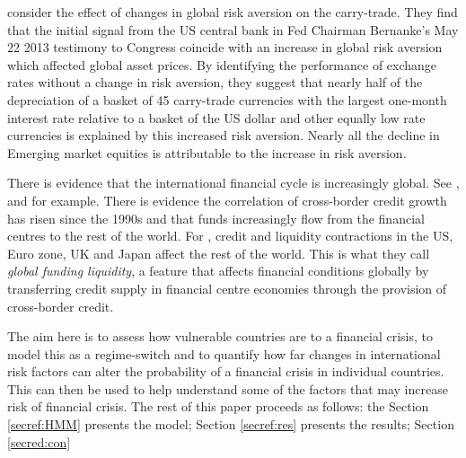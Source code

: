\documentclass[12pt, a4paper, oneside]{article}\usepackage[]{graphicx}\usepackage[]{color}
\begin{document}
\citet{NYFedtaper} consider the effect of changes in global risk aversion on the carry-trade.  They find that the initial signal from the US central bank in Fed Chairman Bernanke's May 22 2013 testimony to Congress coincide with an increase in global risk aversion which affected global asset prices. %
By identifying the performance of exchange rates without a change in risk aversion, they suggest that nearly half of the depreciation of a basket of 45 carry-trade currencies with the largest one-month interest rate relative to a basket of the US dollar and other equally low rate currencies is explained by this increased risk aversion. Nearly all the decline in Emerging market equities is attributable to the increase in risk aversion.

There is evidence that the international financial cycle is increasingly global.  See \citet{Rey2013}, \citet{Obstfeld2014} and \citet{Bruno2014} for example.  %
There is evidence the correlation of cross-border credit growth has risen since the 1990s and that funds increasingly flow from the financial centres to the rest of the world. For \citet{Cerutti2014}, credit and liquidity contractions in  the US, Euro zone, UK and Japan affect the rest of the world.   This is what they call \emph{global funding liquidity}, a feature that affects financial conditions globally by transferring credit supply in financial centre economies through the provision of cross-border credit.

The aim here is to assess how vulnerable countries are to a financial crisis, to model this as a regime-switch and to quantify how far changes in international risk factors can alter the probability of a financial crisis in individual countries.  This can then be used to help understand some of the factors that may increase risk of financial crisis.  The rest of this paper proceeds as follows: the Section \ref{secref:HMM} presents the model; Section \ref{secref:res} presents the results; Section \ref{secred:con}


\end{document}
